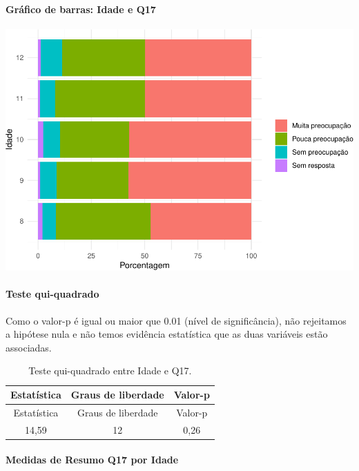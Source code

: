 \documentclass[]{article}
\let\oldparagraph\paragraph
\renewcommand{\paragraph}[1]{\oldparagraph{#1}\mbox{}}
\begin{document}
\hypertarget{gruxe1fico-de-barras-idade-e-q17}{%
\paragraph{Gráfico de barras: Idade e Q17}\label{gruxe1fico-de-barras-idade-e-q17}}

\begin{center}\includegraphics[width=0.75\linewidth]{relatorio_covid19_files/figure-latex/unnamed-chunk-210-1} \end{center}

\hypertarget{teste-qui-quadrado-19}{%
\paragraph{Teste qui-quadrado}\label{teste-qui-quadrado-19}}

Como o valor-p é igual ou maior que 0.01 (nível de significância), não rejeitamos a hipótese nula e não temos evidência estatística que as duas variáveis estão associadas.

\begin{longtable}[]{@{}ccc@{}}
\caption{\label{tab:unnamed-chunk-212}Teste qui-quadrado entre Idade e Q17.}\tabularnewline
\toprule
Estatística & Graus de liberdade & Valor-p\tabularnewline
\midrule
\endfirsthead
\toprule
Estatística & Graus de liberdade & Valor-p\tabularnewline
\midrule
\endhead
14,59 & 12 & 0,26\tabularnewline
\bottomrule
\end{longtable}

\cleardoublepage

\hypertarget{medidas-de-resumo-q17-por-idade}{%
\paragraph{Medidas de Resumo Q17 por Idade}\label{medidas-de-resumo-q17-por-idade}}
\end{document}
